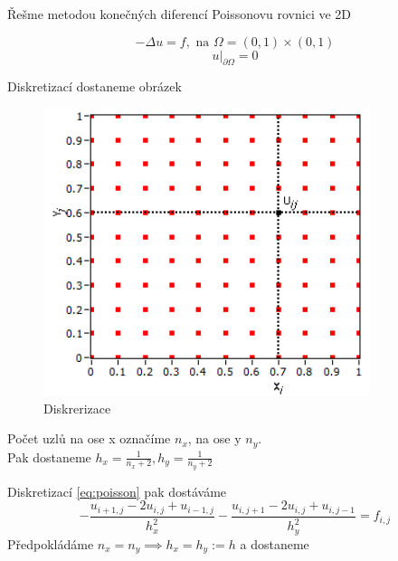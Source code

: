 \documentclass[../main.tex]{subfiles}
\begin{document}
\begin{example}
    Řešme metodou konečných diferencí Poissonovu rovnici ve 2D

    \begin{equation}\label{eq:poisson}
        - \Delta u = f,\text{ na } \Omega = (0,1)\times(0,1) 
    \end{equation}
    \begin{equation*}
        u|_{\partial \Omega} = 0 
    \end{equation*}

    Diskretizací dostaneme obrázek 
    \begin{figure}[h]
        \centering
        \includegraphics[width=\textwidth/2]{images/5-10-diskretizace.png}
        \caption*{Diskrerizace}
    \end{figure}

    Počet uzlů na ose x označíme $n_x$, na ose y $n_y$.\\
    Pak dostaneme $h_x = \frac{1}{n_x+2},h_y = \frac{1}{n_y+2}$

    Diskretizací \eqref{eq:poisson} pak dostáváme
    \begin{equation}
        -\frac{u_{i+1,j} - 2u_{i,j} + u_{i-1,j}}{h_x^2} -\frac{u_{i,j+1} - 2u_{i,j} + u_{i,j-1}}{h_y^2} = f_{i,j}
    \end{equation} 
    Předpokládáme $n_x = n_y \implies h_x = h_y := h$ a dostaneme 


\end{example}
\end{document}
